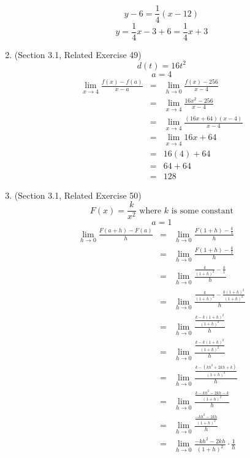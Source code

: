 \documentclass{article}
\begin{document}
\begin{enumerate}
\begin{eqnarray}
    \end{eqnarray}
    $$y - 6 = \frac{1}{4}(x - 12)$$
    $$y = \frac{1}{4}x - 3 + 6 = \frac{1}{4}x + 3$$
    \item (Section 3.1, Related Exercise 49)
    $$d(t) = 16t^2$$
    $$a = 4$$
    \begin{eqnarray}
        \lim_{x \to 4}{\frac{f(x) - f(a)}{x - a}} &=& \lim_{h \to 0}{\frac{f(x) - 256}{x - 4}} \\
        &=& \lim_{x \to 4}{\frac{16x^2 - 256}{x - 4}} \\
        &=& \lim_{x \to 4}{\frac{(16x + 64)(x - 4)}{x - 4}} \\
        &=& \lim_{x \to 4}{16x + 64} \\
        &=& 16(4) + 64 \\
        &=& 64 + 64 \\
        &=& 128
    \end{eqnarray}
    \item (Section 3.1, Related Exercise 50)
    $$F(x) = \frac{k}{x^2} \text{ where } k \text{ is some constant}$$
    $$a = 1$$
    \begin{eqnarray}
        \lim_{h \to 0}{\frac{F(a + h) - F(a)}{h}} &=& \lim_{h \to 0}{\frac{F(1 + h) - \frac{k}{1}}{h}} \\
                                                &=& \lim_{h \to 0}{\frac{F(1 + h) - \frac{k}{1}}{h}} \\
                                                &=& \lim_{h \to 0}{\frac{\frac{k}{(1 + h)^2} - \frac{k}{1}}{h}} \\
                                                &=& \lim_{h \to 0}{\frac{\frac{k}{(1 + h)^2} - \frac{k(1 + h)^2}{(1 + h)^2}}{h}} \\
                                                &=& \lim_{h \to 0}{\frac{\frac{k - k(1 + h)^2}{(1 + h)^2}}{h}} \\
                                                &=& \lim_{h \to 0}{\frac{\frac{k - k(1 + h)^2}{(1 + h)^2}}{h}} \\
                                                &=& \lim_{h \to 0}{\frac{\frac{k - (kh^2 + 2kh + k)}{(1 + h)^2}}{h}} \\
                                                &=& \lim_{h \to 0}{\frac{\frac{k - kh^2 - 2kh - k}{(1 + h)^2}}{h}} \\
                                                &=& \lim_{h \to 0}{\frac{\frac{- kh^2 - 2kh}{(1 + h)^2}}{h}} \\
                                                &=& \lim_{h \to 0}{\frac{- kh^2 - 2kh}{(1 + h)^2} \cdot \frac{1}{h}} \\

\end{eqnarray}
\end{enumerate}
\end{document}
